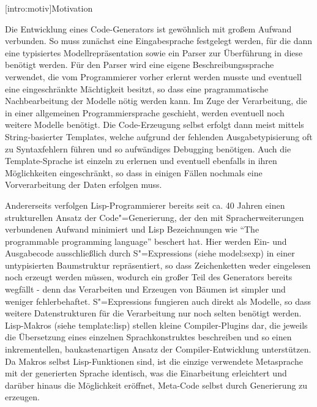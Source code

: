 \documentclass[11pt, a4paper, bibgerm]{scrbook}
\newcommand\lsection{}
\newcommand\sref{}
\newcommand{\sees}[1]{(siehe \sref{#1})}
\newcommand{\sexps}{S"=Expressions}
\newcommand{\cgen}{Code"=Generierung}
\begin{document}
\lsection[intro:motiv]{Motivation}

Die Entwicklung eines Code-Generators ist gewöhnlich mit großem Aufwand
verbunden. So muss zunächst eine Eingabesprache festgelegt werden, für
die dann eine typisiertes Modellrepräsentation sowie ein Parser zur
Überführung in diese benötigt werden. Für den Parser wird eine eigene
Beschreibungssprache verwendet, die vom Programmierer vorher erlernt
werden musste und eventuell eine eingeschränkte Mächtigkeit besitzt, so
dass eine pragrammatische Nachbearbeitung der Modelle nötig werden
kann. Im Zuge der Verarbeitung, die in einer allgemeinen
Programmiersprache geschieht, werden eventuell noch weitere Modelle
benötigt. Die Code-Erzeugung selbst erfolgt dann meist mittels
String-basierter Templates, welche aufgrund der fehlenden
Ausgabetypisierung oft zu Syntaxfehlern führen und so aufwändiges
Debugging benötigen. Auch die Template-Sprache ist einzeln zu erlernen
und eventuell ebenfalls in ihren Möglichkeiten eingeschränkt, so dass in
einigen Fällen nochmals eine Vorverarbeitung der Daten erfolgen muss.

Andererseits verfolgen Lisp-Programmierer bereits seit ca. 40
Jahren\cite{EvolutionOfLisp} einen strukturellen Ansatz der \cgen{}, der den
mit Spracherweiterungen verbundenen Aufwand minimiert und Lisp
Bezeichnungen wie "`The programmable programming
language"'\cite{Federano} beschert hat. Hier werden Ein- und Ausgabecode
ausschließlich durch \sexps{} \sees{model:sexp} in einer untypisierten
Baumstruktur repräsentiert, so dass Zeichenketten weder eingelesen noch
erzeugt werden müssen, wodurch ein großer Teil des Generators bereits
wegfällt - denn das Verarbeiten und Erzeugen von Bäumen ist simpler und
weniger fehlerbehaftet. \sexps{} fungieren auch direkt als Modelle, so
dass weitere Datenstrukturen für die Verarbeitung nur noch selten
benötigt werden. Lisp-Makros \sees{template:lisp} stellen kleine
Compiler-Plugins dar, die jeweils die Übersetzung eines einzelnen
Sprachkonstruktes beschreiben und so einen inkrementellen,
baukastenartigen Ansatz der Compiler-Entwicklung unterstützen. Da Makros
selbst Lisp-Funktionen sind, ist die einzige verwendete Metasprache mit
der generierten Sprache identisch, was die Einarbeitung erleichtert und
darüber hinaus die Möglichkeit eröffnet, Meta-Code selbst durch
Generierung zu erzeugen.
\end{document}
